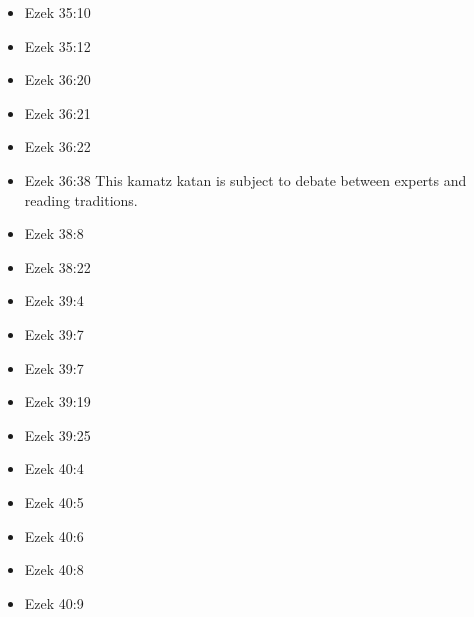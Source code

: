 \documentclass[14pt]{article}
\begin{document}
\begin{multicols}{2}
\begin{itemize}
														\item Ezek 35:10
														
														\item Ezek 35:12
														
														\item Ezek 36:20
														
														\item Ezek 36:21
														
														\item Ezek 36:22
														
														\item Ezek 36:38 This kamatz katan is subject to debate between experts and reading traditions.
														
														\item Ezek 38:8
														
														\item Ezek 38:22
														
														\item Ezek 39:4
														
														\item Ezek 39:7
														
														\item Ezek 39:7
														
														\item Ezek 39:19
														
														\item Ezek 39:25
														
														\item Ezek 40:4
														
														\item Ezek 40:5
														
														\item Ezek 40:6
														
														\item Ezek 40:8
														
														\item Ezek 40:9
														

\end{itemize}
\end{multicols}
\end{document}
